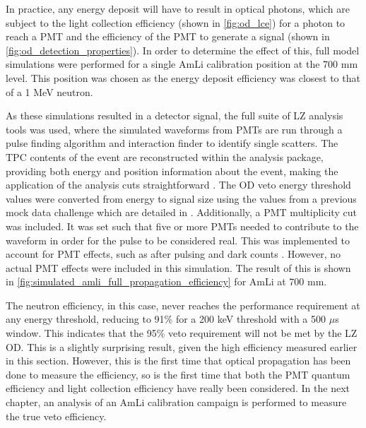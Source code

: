 



\par
In practice, any energy deposit will have to result in optical photons, which are subject to the light collection efficiency (shown in \autoref{fig:od_lce}) for a photon to reach a PMT and the efficiency of the PMT to generate a signal (shown in \autoref{fig:od_detection_properties}).
In order to determine the effect of this, full model simulations were performed for a single AmLi calibration position at the 700 mm level.
This position was chosen as the energy deposit efficiency was closest to that of a 1 MeV neutron.

\par
As these simulations resulted in a detector signal, the full suite of LZ analysis tools was used, where the simulated waveforms from PMTs are run through a pulse finding algorithm and interaction finder to identify single scatters.
The TPC contents of the event are reconstructed within the analysis package, providing both energy and position information about the event, making the application of the analysis cuts straightforward \cite{lz_simulations_ref}.
The OD veto energy threshold values were converted from energy to signal size using the values from a previous mock data challenge which are detailed in \cite{jonathannikoleyczik_thesis_ref}.
Additionally, a PMT multiplicity cut was included.
It was set such that five or more PMTs needed to contribute to the waveform in order for the pulse to be considered real.
This was implemented to account for PMT effects, such as after pulsing and dark counts \cite{jonathannikoleyczik_thesis_ref}.
However, no actual PMT effects were included in this simulation.
The result of this is shown in \autoref{fig:simulated_amli_full_propagation_efficiency} for AmLi at 700 mm. 

\par
The neutron efficiency, in this case, never reaches the performance requirement at any energy threshold, reducing to 91\% for a 200 keV threshold with a 500 $\mu$s window.
This indicates that the 95\% veto requirement will not be met by the LZ OD.
This is a slightly surprising result, given the high efficiency measured earlier in this section.
However, this is the first time that optical propagation has been done to measure the efficiency, so is the first time that both the PMT quantum efficiency and light collection efficiency have really been considered.
In the next chapter, an analysis of an AmLi calibration campaign is performed to measure the true veto efficiency.

